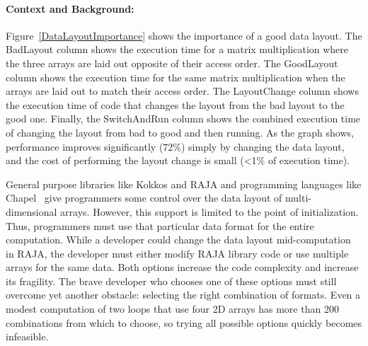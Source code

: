 \documentclass{article}
\begin{document}
\paragraph{Context and Background:}

Figure~\ref{DataLayoutImportance} shows the importance of a good data layout. 
The BadLayout column shows the execution time for a matrix multiplication where the three arrays are laid out opposite of their access order. 
The GoodLayout column shows the execution time for the same matrix multiplication when the arrays are laid out to match their access order.
The LayoutChange column shows the execution time of code that changes the layout from the bad layout to the good one.
Finally, the SwitchAndRun column shows the combined execution time of changing the layout from bad to good and then running.
As the graph shows, performance improves  significantly (72\%) simply by changing the data layout, and the cost of performing the layout change is small (<1\% of execution time). 

General purpose libraries like Kokkos and RAJA and programming languages like Chapel~\cite{diaconescu2007approach} give programmers some control over the data layout of multi-dimensional arrays. However, this support is limited to the point of initialization.
Thus, programmers must use that particular data format for the entire computation.
While a developer could change the data layout mid-computation in RAJA, the developer must either modify RAJA library code or use multiple arrays for the same data. 
Both options increase the code complexity and increase its fragility.
The brave developer who chooses one of these options must still overcome yet another obstacle: selecting the right combination of formats.
Even a modest computation of two loops that use four 2D arrays has more than 200 combinations from which to choose, so trying all possible options quickly becomes infeasible. 
\end{document}

